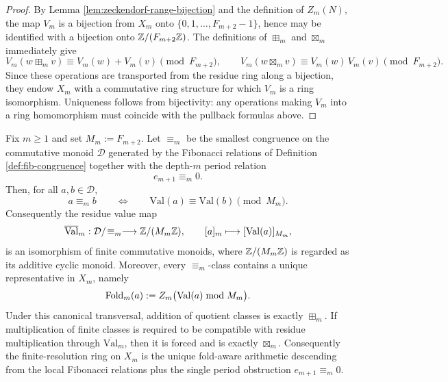 \begin{proof}
By Lemma \ref{lem:zeckendorf-range-bijection} and the definition of \(Z_m(N)\), the map \(V_m\) is a bijection from \(X_m\) onto \(\{0,1,\dots,F_{m+2}-1\}\), hence may be identified with a bijection onto \(\mathbb{Z}/(F_{m+2}\mathbb{Z})\). The definitions of \(\boxplus_m\) and \(\boxtimes_m\) immediately give
\[
V_m(w\boxplus_m v)\equiv V_m(w)+V_m(v)\pmod{F_{m+2}},
\qquad
V_m(w\boxtimes_m v)\equiv V_m(w)\,V_m(v)\pmod{F_{m+2}}.
\]
Since these operations are transported from the residue ring along a bijection, they endow \(X_m\) with a commutative ring structure for which \(V_m\) is a ring isomorphism. Uniqueness follows from bijectivity: any operations making \(V_m\) into a ring homomorphism must coincide with the pullback formulas above.
\end{proof}

\begin{theorem}\label{thm:finite-quotient-residue-fold-classification}
Fix \(m\ge 1\) and set \(M_m:=F_{m+2}\). Let \(\equiv_m\) be the smallest congruence on the commutative monoid \(\mathcal{D}\) generated by the Fibonacci relations of Definition \ref{def:fib-congruence} together with the depth-\(m\) period relation
\[
e_{m+1}\equiv_m 0.
\]
Then, for all \(a,b\in\mathcal D\),
\[
a\equiv_m b
\qquad\Longleftrightarrow\qquad
\mathrm{Val}(a)\equiv \mathrm{Val}(b)\pmod {M_m}.
\]
Consequently the residue value map
\[
\overline{\mathrm{Val}}_m:\mathcal{D}/\!\equiv_m\longrightarrow \mathbb{Z}/(M_m\mathbb{Z}),
\qquad
[a]_m\longmapsto [\mathrm{Val}(a)]_{M_m},
\]
is an isomorphism of finite commutative monoids, where \(\mathbb{Z}/(M_m\mathbb{Z})\) is regarded as its additive cyclic monoid. Moreover, every \(\equiv_m\)-class contains a unique representative in \(X_m\), namely
\[
\operatorname{Fold}_m(a):=Z_m\bigl(\mathrm{Val}(a)\bmod M_m\bigr).
\]
Under this canonical transversal, addition of quotient classes is exactly \(\boxplus_m\). If multiplication of finite classes is required to be compatible with residue multiplication through \(\overline{\mathrm{Val}}_m\), then it is forced and is exactly \(\boxtimes_m\). Consequently the finite-resolution ring on \(X_m\) is the unique fold-aware arithmetic descending from the local Fibonacci relations plus the single period obstruction \(e_{m+1}\equiv_m0\).
\end{theorem}

